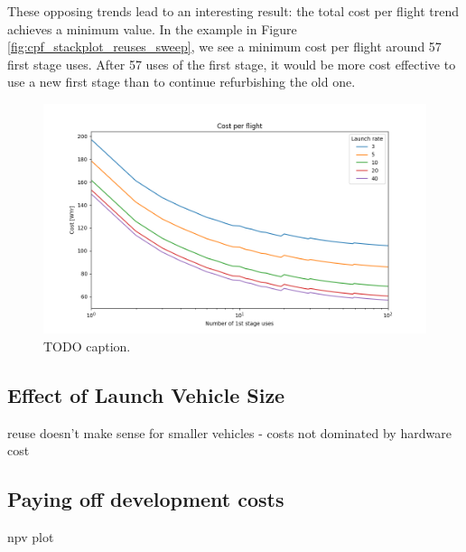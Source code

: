 \documentclass[conf]{new-aiaa}
\begin{document}
These opposing trends lead to an interesting result: the total cost per flight trend achieves a minimum value. In the example in Figure \ref{fig:cpf_stackplot_reuses_sweep}, we see a minimum cost per flight around 57 first stage uses. After 57 uses of the first stage, it would be more cost effective to use a new first stage than to continue refurbishing the old one. 

\begin{figure}[hbt!]
    \centering
    \includegraphics[width=\textwidth]{../../lvreuse/analysis/combined/plots/cpf_reuses_sweep_vary_launch_rate}
    \caption{\label{fig:cpf_reuses_sweep_vary_launch_rate} TODO caption.}
\end{figure}

\subsection{Effect of Launch Vehicle Size}
reuse doesn't make sense for smaller vehicles - costs not dominated by hardware cost

\subsection{Paying off development costs}
npv plot


\end{document}
